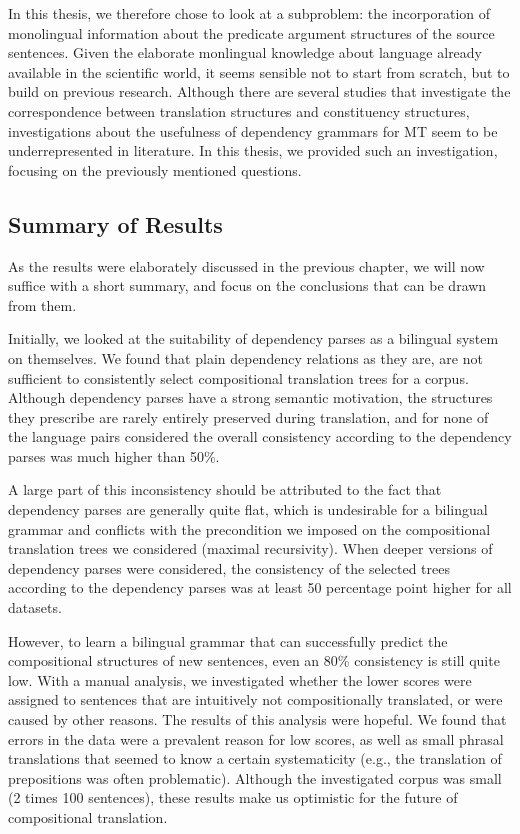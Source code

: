 In this thesis, we therefore chose to look at a subproblem: the incorporation of monolingual information about the predicate argument structures of the source sentences. Given the elaborate monlingual knowledge about language already available in the scientific world, it seems sensible not to start from scratch, but to build on previous research. Although there are several studies that investigate the correspondence between translation structures and constituency structures, investigations about the usefulness of dependency grammars for MT seem to be underrepresented in literature. In this thesis, we provided such an investigation, focusing on the previously mentioned questions.

\subsection{Summary of Results}

As the results were elaborately discussed in the previous chapter, we will now suffice with a short summary, and focus on the conclusions that can be drawn from them.

Initially, we looked at the suitability of dependency parses as a bilingual system on themselves. We found that plain dependency relations as they are, are not sufficient to consistently select compositional translation trees for a corpus. Although dependency parses have a strong semantic motivation, the structures they prescribe are rarely entirely preserved during translation, and for none of the language pairs considered the overall consistency according to the dependency parses was much higher than 50\%. 

A large part of this inconsistency should be attributed to the fact that dependency parses are generally quite flat, which is undesirable for a bilingual grammar and conflicts with the precondition we imposed on the compositional translation trees we considered (maximal recursivity). When deeper versions of dependency parses were considered, the consistency of the selected trees according to the dependency parses was at least 50 percentage point higher for all datasets.

However, to learn a bilingual grammar that can successfully predict the compositional structures of new sentences, even an 80\% consistency is still quite low. With a manual analysis, we investigated whether the lower scores were assigned to sentences that are intuitively not compositionally translated, or were caused by other reasons. The results of this analysis were hopeful. We found that errors in the data were a prevalent reason for low scores, as well as small phrasal translations that seemed to know a certain systematicity (e.g., the translation of prepositions was often problematic). Although the investigated corpus was small (2 times 100 sentences), these results make us optimistic for the future of compositional translation.

